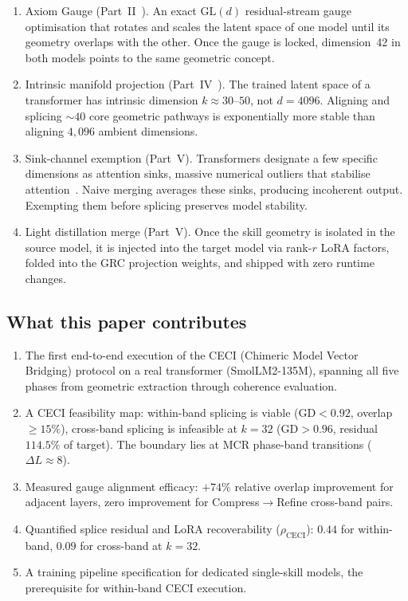\documentclass[11pt]{article}
\begin{document}
\begin{enumerate}
\item Axiom Gauge (Part~II~\cite{stewart2026gp}).  An exact
      $\mathrm{GL}(d)$ residual-stream gauge optimisation that rotates
      and scales the latent space of one model until its geometry
      overlaps with the other.  Once the gauge is locked, dimension~42
      in both models points to the same geometric concept.

\item Intrinsic manifold projection (Part~IV~\cite{stewart2026ott}).
      The trained latent space of a transformer has intrinsic dimension
      $k{\approx}30$--$50$, not $d{=}4096$.  Aligning and splicing
      ${\sim}40$ core geometric pathways is exponentially more stable
      than aligning $4{,}096$ ambient dimensions.

\item Sink-channel exemption (Part~V).  Transformers designate
      a few specific dimensions as attention sinks, massive numerical
      outliers that stabilise attention~\cite{sun2024massive,
      xiao2023streamingllm}.  Naive merging averages these sinks,
      producing incoherent output.  Exempting them before splicing
      preserves model stability.

\item Light distillation merge (Part~V).  Once the skill
      geometry is isolated in the source model, it is injected into the
      target model via rank-$r$ LoRA factors, folded into the GRC
      projection weights, and shipped with zero runtime changes.
\end{enumerate}

\subsection{What this paper contributes}

\begin{enumerate}
\item The first end-to-end execution of the CECI (Chimeric Model Vector
      Bridging) protocol on a real transformer (SmolLM2-135M), spanning
      all five phases from geometric extraction through coherence
      evaluation.
\item A CECI feasibility map: within-band splicing is viable
      (GD${<}0.92$, overlap ${\ge}15\%$), cross-band splicing is
      infeasible at $k{=}32$ (GD${>}0.96$, residual $114.5\%$ of target).
      The boundary lies at MCR phase-band transitions ($\Delta L{\approx}8$).
\item Measured gauge alignment efficacy: $+74\%$ relative overlap
      improvement for adjacent layers, zero improvement for
      Compress$\to$Refine cross-band pairs.
\item Quantified splice residual and LoRA recoverability ($\rho_{\mathrm{CECI}}$):
      $0.44$ for within-band, $0.09$ for cross-band at $k{=}32$.
\item A training pipeline specification for dedicated single-skill
      models, the prerequisite for within-band CECI execution.
\end{enumerate}
\end{document}

